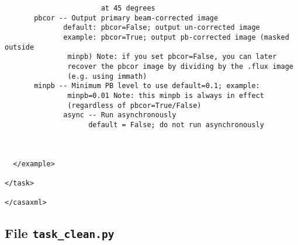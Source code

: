 \begin{verbatim}
                       at 45 degrees
       pbcor -- Output primary beam-corrected image 
              default: pbcor=False; output un-corrected image 
              example: pbcor=True; output pb-corrected image (masked outside
               minpb) Note: if you set pbcor=False, you can later
               recover the pbcor image by dividing by the .flux image
               (e.g. using immath)
       minpb -- Minimum PB level to use default=0.1; example:
               minpb=0.01 Note: this minpb is always in effect
               (regardless of pbcor=True/False) 
              async -- Run asynchronously 
                    default = False; do not run asynchronously



  </example>

</task>

</casaxml>
\end{verbatim}


\subsection{File {\tt task\_clean.py} }
\label{section:write.clean.py}

